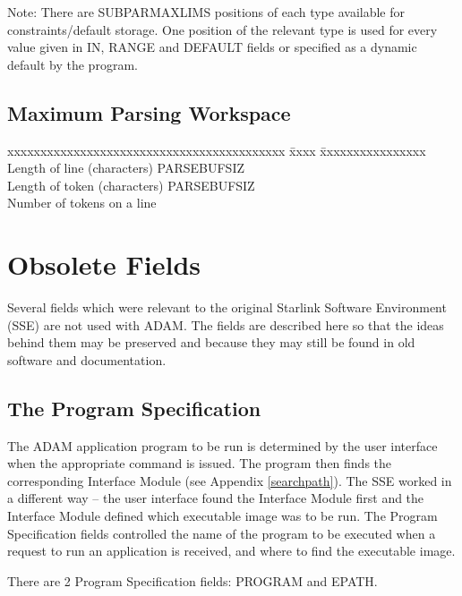 \documentclass[twoside,11pt]{article}
\newcommand{\xlabel}[1]{}
\renewcommand{\_}{\texttt{\symbol{95}}}
\begin{document}
Note: There are SUBPAR\_\_MAXLIMS positions of each type available for
constraints/default storage. One position of the relevant type is used 
for every value given in IN, RANGE and DEFAULT fields or specified as a dynamic
default by the program.

\subsection*{Maximum Parsing Workspace}
\begin{center}
\begin{tabbing}
xxxxxxxxxxxxxxxxxxxxxxxxxxxxxxxxxxxxxxxxxx \= xxxx \= xxxxxxxxxxxxxxxx \kill
Length of line (characters)  \> PARSE\_\_BUFSIZ \\
Length of token (characters)  \> PARSE\_\_BUFSIZ \\
Number of tokens on a line \\
\end{tabbing} \end{center}

\newpage
\section{Obsolete Fields\xlabel{obsolete_fields}}

Several fields which were relevant to the original Starlink Software
Environment (SSE) are not used with ADAM.
The fields are described here so that the ideas behind them may be preserved 
and because they may still be found in old software and documentation.

\subsection{The Program Specification
\xlabel{the_program_specification}\label{program}}

The ADAM application program to be run is determined by the user interface
when the appropriate command is issued.
The program then finds the corresponding Interface Module (see Appendix
\ref{searchpath}).
The SSE worked in a different way -- the user interface found the Interface
Module first and the Interface Module defined which executable image
was to be run.
The Program Specification fields controlled the name of the program to be
executed when a request to run an application is received, and where to find 
the executable image.

There are 2 Program Specification fields: PROGRAM and EPATH.
\end{document}
